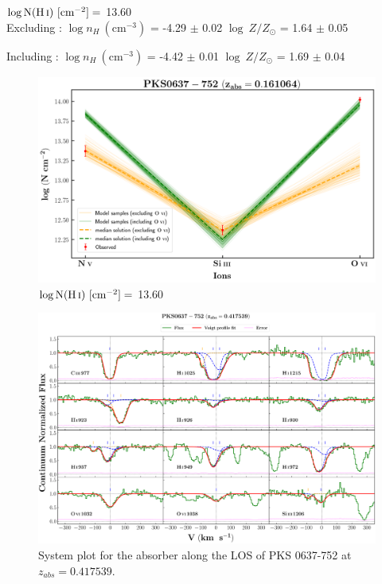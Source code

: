   $\log \text{N}(\ion{H}{i}) \ [\text{cm}^{-2}]=$ 13.60 \\
  
  Excluding  : $\log n_H \ (\text{cm}^{-3})$ = -4.29 $\pm$ 0.02 \hspace{10mm} $\log \ Z/Z_\odot$ = 1.64 $\pm$ 0.05
  
  Including  : $\log n_H \ (\text{cm}^{-3})$ = -4.42 $\pm$ 0.01 \hspace{10mm} $\log \ Z/Z_\odot$ = 1.69 $\pm$ 0.04 \\
  
  
  \begin{figure}[!h]
    \centering
    \includegraphics[width=0.9\linewidth]{Ionisation-Modelling-Plots/pks0637-z=0.161064-compI_logZ=1.png}
    \caption{$\log \text{N}(\ion{H}{i}) \ [\text{cm}^{-2}]=$ 13.60}
  \end{figure}
  
  
  
  \newpage
  \thispagestyle{empty}
  
  \begin{landscape}
  
      \begin{figure}
      \centering
      \vspace{-10mm}
      \hspace*{-20mm}
      \includegraphics[width=1.1\linewidth]{System-Plots/PKS0637-752_z=0.417539_sys_plot.png}
      \caption{System plot for the absorber along the LOS of PKS 0637-752 at $z_{abs} = 0.417539$. }
      \end{figure}
      
  \end{landscape}
  
